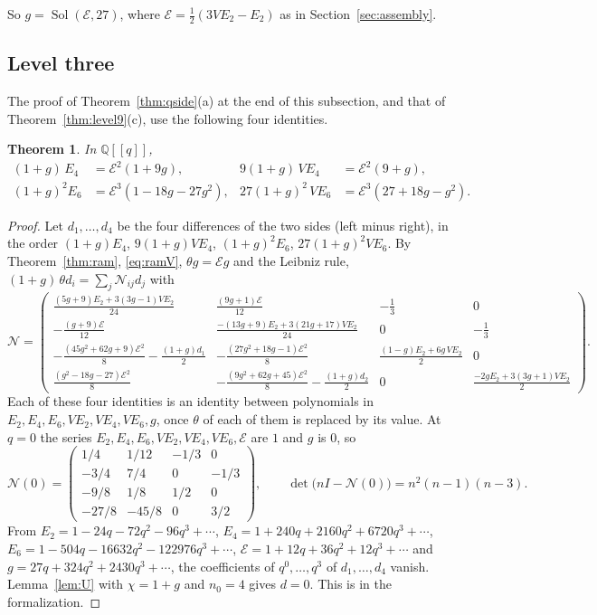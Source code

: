 \documentclass[11pt]{amsart}
\newtheorem{theorem}{Theorem}[section]
\theoremstyle{definition}
\numberwithin{equation}{section}
\newcommand{\lean}[1]{\ignorespaces}
\newcommand{\Q}{\mathbb{Q}}
\newcommand{\cE}{\mathcal{E}}
\newcommand{\Sol}{\operatorname{Sol}}
\begin{document}
So $g=\Sol(\cE,27)$, where $\cE=\frac12(3VE_2-E_2)$ as in Section~\ref{sec:assembly}.

\subsection{Level three}

The proof of Theorem~\ref{thm:qside}(a) at the end of this subsection, and that of Theorem~\ref{thm:level9}(c), use the following four identities.

\begin{theorem}\label{thm:level3}\lean{CalegariSlopes.Bridge.theoremA}
In $\Q[[q]]$,
\begin{align*}
(1+g)\,E_4&=\cE^2(1+9g), & 9(1+g)\,VE_4&=\cE^2(9+g),\\
(1+g)^2E_6&=\cE^3(1-18g-27g^2), & 27(1+g)^2\,VE_6&=\cE^3(27+18g-g^2).
\end{align*}
\end{theorem}

\begin{proof}
Let $d_1,\ldots,d_4$ be the four differences of the two sides (left minus right), in the order $(1+g)E_4$, $9(1+g)VE_4$, $(1+g)^2E_6$, $27(1+g)^2VE_6$. By Theorem~\ref{thm:ram}, \eqref{eq:ramV}, $\theta g=\cE g$ and the Leibniz rule, $(1+g)\,\theta d_i=\sum_j\mathcal N_{ij}d_j$ with
\[
\mathcal N=\begin{pmatrix}
\frac{(5g+9)E_2+3(3g-1)VE_2}{24} & \frac{(9g+1)\cE}{12} & -\frac13 & 0\\[2pt]
-\frac{(g+9)\cE}{12} & \frac{-(13g+9)E_2+3(21g+17)VE_2}{24} & 0 & -\frac13\\[2pt]
-\frac{(45g^2+62g+9)\cE^2}{8}-\frac{(1+g)d_1}2 & -\frac{(27g^2+18g-1)\cE^2}{8} & \frac{(1-g)E_2+6g\,VE_2}{2} & 0\\[2pt]
\frac{(g^2-18g-27)\cE^2}{8} & -\frac{(9g^2+62g+45)\cE^2}{8}-\frac{(1+g)d_2}2 & 0 & \frac{-2gE_2+3(3g+1)VE_2}{2}
\end{pmatrix}.
\]
Each of these four identities is an identity between polynomials in $E_2,E_4,E_6,VE_2,VE_4,VE_6,g$, once $\theta$ of each of them is replaced by its value. At $q=0$ the series $E_2,E_4,E_6,VE_2,VE_4,VE_6,\cE$ are $1$ and $g$ is $0$, so
\[
\mathcal N(0)=\begin{pmatrix}1/4&1/12&-1/3&0\\-3/4&7/4&0&-1/3\\-9/8&1/8&1/2&0\\-27/8&-45/8&0&3/2\end{pmatrix},\qquad \det\bigl(nI-\mathcal N(0)\bigr)=n^2(n-1)(n-3).
\]
From $E_2=1-24q-72q^2-96q^3+\cdots$, $E_4=1+240q+2160q^2+6720q^3+\cdots$, $E_6=1-504q-16632q^2-122976q^3+\cdots$, $\cE=1+12q+36q^2+12q^3+\cdots$ and $g=27q+324q^2+2430q^3+\cdots$, the coefficients of $q^0,\ldots,q^3$ of $d_1,\ldots,d_4$ vanish. Lemma~\ref{lem:U} with $\chi=1+g$ and $n_0=4$ gives $d=0$. This is  in the formalization.
\end{proof}
\end{document}
